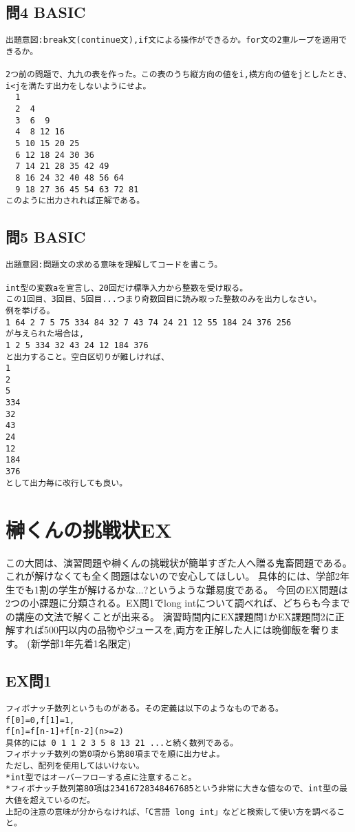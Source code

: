 \documentclass[a4j,titlepage,dvipdfmx]{jsarticle}   %
\begin{document}
\subsection{問4 BASIC}
\begin{verbatim}
出題意図:break文(continue文),if文による操作ができるか。for文の2重ループを適用できるか。

2つ前の問題で、九九の表を作った。この表のうち縦方向の値をi,横方向の値をjとしたとき、i<jを満たす出力をしないようにせよ。
  1
  2  4
  3  6  9
  4  8 12 16
  5 10 15 20 25
  6 12 18 24 30 36
  7 14 21 28 35 42 49
  8 16 24 32 40 48 56 64
  9 18 27 36 45 54 63 72 81
このように出力されれば正解である。
\end{verbatim}

\subsection{問5 BASIC}
\begin{verbatim}
出題意図:問題文の求める意味を理解してコードを書こう。

int型の変数aを宣言し、20回だけ標準入力から整数を受け取る。
この1回目、3回目、5回目...つまり奇数回目に読み取った整数のみを出力しなさい。
例を挙げる。
1 64 2 7 5 75 334 84 32 7 43 74 24 21 12 55 184 24 376 256
が与えられた場合は,
1 2 5 334 32 43 24 12 184 376
と出力すること。空白区切りが難しければ、
1
2
5
334
32
43
24
12
184
376
として出力毎に改行しても良い。
\end{verbatim}

\section{榊くんの挑戦状EX}
この大問は、演習問題や榊くんの挑戦状が簡単すぎた人へ贈る鬼畜問題である。
これが解けなくても全く問題はないので安心してほしい。
具体的には、学部2年生でも1割の学生が解けるかな...?というような難易度である。
今回のEX問題は2つの小課題に分類される。EX問1でlong intについて調べれば、どちらも今までの講座の文法で解くことが出来る。
演習時間内にEX課題問1かEX課題問2に正解すれば500円以内の品物やジュースを,両方を正解した人には晩御飯を奢ります。
(新学部1年先着1名限定)

\subsection{EX問1}
\begin{verbatim}
フィボナッチ数列というものがある。その定義は以下のようなものである。
f[0]=0,f[1]=1,
f[n]=f[n-1]+f[n-2](n>=2)
具体的には 0 1 1 2 3 5 8 13 21 ...と続く数列である。
フィボナッチ数列の第0項から第80項までを順に出力せよ。
ただし、配列を使用してはいけない。
*int型ではオーバーフローする点に注意すること。
*フィボナッチ数列第80項は23416728348467685という非常に大きな値なので、int型の最大値を超えているのだ。
上記の注意の意味が分からなければ、「C言語 long int」などと検索して使い方を調べること。
\end{verbatim}
\end{document}
